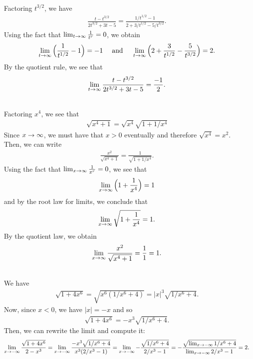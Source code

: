 	\spc
	
	\\
	Factoring $t^{3/2}$, we have
		\begin{align*}
		\frac{t - t^{3/2}}{2t^{3/2} + 3t - 5} = \frac{1/t^{1/2} - 1}{2 + 3/t^{1/2} - 5/t^{3/2}} .
		\end{align*}
	Using the fact that $\lim_{t \rightarrow \infty} \frac{1}{t^r} = 0$, we obtain
		\begin{align*}
		\lim_{t \rightarrow \infty} \Big( \frac{1}{t^{1/2}} - 1 \Big) = -1 \quad \text{ and } \quad \lim_{t \rightarrow \infty} \Big( 2 + \frac{3}{t^{1/2}} - \frac{5}{t^{3/2}} \Big) = 2 .
		\end{align*}
	By the quotient rule, we see that
		\begin{align*}
		\lim_{t \rightarrow \infty} \frac{t - t^{3/2}}{2t^{3/2} + 3t - 5} = \frac{-1}{2} .
		\end{align*}				
		
	\spc
	
	\\
	Factoring $x^4$, we see that
		\begin{align*}
		\sqrt{x^4 + 1} = \sqrt{x^4} \sqrt{1 + 1/x^4}
		\end{align*}
	Since $x \rightarrow \infty$, we must have that $x > 0$ eventually and therefore $\sqrt{x^4} = x^2$. Then, we can write
		\begin{align*}
		\frac{x^2}{\sqrt{x^4 + 1}} = \frac{1}{\sqrt{1 + 1/x^4}} .
		\end{align*}
	Using the fact that $\lim_{x \rightarrow \infty} \frac{1}{x^r} = 0$, we see that
		\begin{align*}
		\lim_{x \rightarrow \infty} \Big( 1 + \frac{1}{x^4} \Big) = 1
		\end{align*}
	and by the root law for limits, we conclude that
		\begin{align*}
		\lim_{x \rightarrow \infty} \sqrt{1 + \frac{1}{x^4}} = 1 .
		\end{align*}
	By the quotient law, we obtain
		\begin{align*}
		\lim_{x \rightarrow \infty} \frac{x^2}{\sqrt{x^4 + 1}} = \frac{1}{1} = 1 .
		\end{align*}
		
	\spc
	
	\\
	We have
		\begin{align*}
		\sqrt{1 + 4x^6} = \sqrt{x^6 (1/x^6 + 4)} = |x|^3 \sqrt{1/x^6 + 4} .
		\end{align*}
	Now, since $x < 0$, we have $|x| = -x$ and so
		\begin{align*}
		\sqrt{1 + 4x^6} = -x^3 \sqrt{1/x^6 + 4} .
		\end{align*}
	Then, we can rewrite the limit and compute it:
		\begin{align*}
		\lim_{x \rightarrow -\infty} \frac{\sqrt{1 + 4x^6}}{2 - x^3} = \lim_{x \rightarrow -\infty} \frac{-x^3 \sqrt{1/x^6 + 4}}{x^3 (2/x^3 - 1)} = \lim_{x \rightarrow -\infty} -\frac{\sqrt{1/x^6 + 4}}{2/x^3 - 1} = - \frac{\sqrt{\lim_{x \rightarrow -\infty} 1/x^6 + 4}}{\lim_{x \rightarrow -\infty} 2/x^3 - 1} = 2 .
		\end{align*}
		
